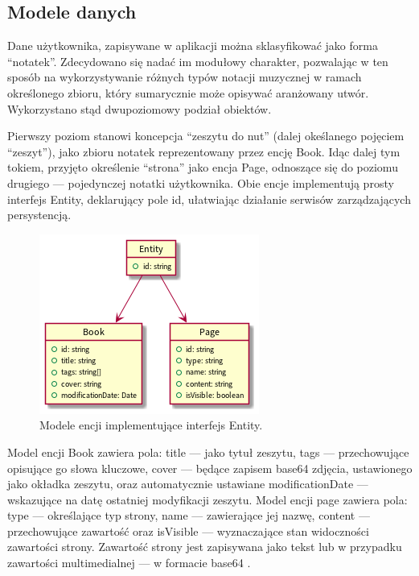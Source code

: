 \subsection{Modele danych}
Dane użytkownika, zapisywane w aplikacji można sklasyfikować jako forma \enquote{notatek}.
Zdecydowano się nadać im modułowy charakter, pozwalając w ten sposób na wykorzystywanie różnych typów notacji muzycznej
w ramach określonego zbioru, który sumarycznie może opisywać aranżowany utwór.
Wykorzystano stąd dwupoziomowy podział obiektów.

Pierwszy poziom stanowi koncepcja
\enquote{zeszytu do nut} (dalej okeślanego pojęciem \enquote{zeszyt}), jako zbioru notatek reprezentowany przez encję Book.
Idąc dalej tym tokiem, przyjęto określenie \enquote{strona} jako encja Page,
odnoszące się do poziomu drugiego — pojedynczej notatki użytkownika.
Obie encje implementują prosty interfejs Entity, deklarujący pole id,
ułatwiając działanie serwisów zarządzających persystencją.

\begin{figure}[H]
	\begin{center}
		\includegraphics[scale=0.9]{media/Entity.png}
	\end{center}
	\caption{Modele encji implementujące interfejs Entity.}
	\label{rys:entity}
\end{figure}

Model encji Book zawiera pola: title — jako tytuł zeszytu, tags — przechowujące opisujące go słowa kluczowe,
cover — będące zapisem base64 \cite{64} zdjęcia, ustawionego jako okładka zeszytu, oraz automatycznie ustawiane modificationDate — wskazujące
na datę ostatniej modyfikacji zeszytu.
Model encji page zawiera pola: type — określające typ strony, name — zawierające jej nazwę, content — przechowujące zawartość oraz
isVisible — wyznaczające stan widoczności zawartości strony.
Zawartość strony jest zapisywana jako tekst lub w przypadku zawartości multimedialnej — w formacie base64 \cite{64}.

